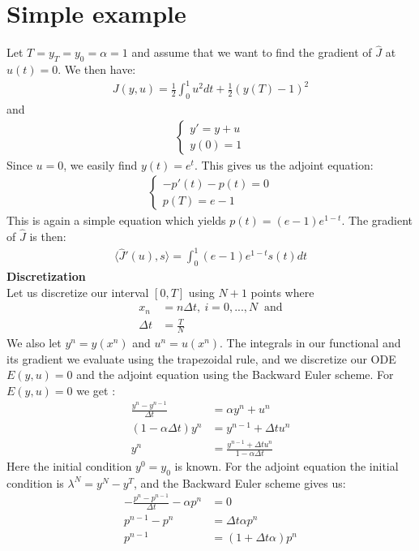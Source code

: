 \documentclass[11pt,a4paper]{article}
\begin{document}
\section*{Simple example}
Let $T=y_T=y_0=\alpha=1$ and assume that we want to find the gradient of $\hat{J}$ at $u(t)=0$. We then have:
\begin{gather}
J(y,u) = \frac{1}{2}\int_0^1u^2dt + \frac{1}{2}(y(T)-1)^2
\end{gather} 
and
\begin{align}
\left\{
     \begin{array}{lr}
       	y' =  y +u\\
       	   y(0)=1
     \end{array}
   \right.
\end{align}
Since $u=0$, we easily find $y(t)=e^t$. This gives us the adjoint equation:
\begin{align}
   \left\{
     \begin{array}{lr}
       -p'(t) -p(t)=0  \\
       p(T) = e-1
     \end{array}
   \right.
\end{align}
This is again a simple equation which yields $p(t)=(e-1)e^{1-t}$. The gradient of $\hat{J}$ is then:
\begin{align*}
\langle\hat{J}'(u),s\rangle=\int_0^1(e-1)e^{1-t}s(t)dt
\end{align*}
\textbf{Discretization}
\\
Let us discretize our interval $[0,T]$ using $N+1$ points where 
\begin{align*}
x_n &= n\Delta t, \ i=0,...,N \ \text{ and} \\
\Delta t &= \frac{T}{N}
\end{align*}
We also let $y^n = y(x^n)$ and $u^n=u(x^n)$. The integrals in our functional and its gradient we evaluate using the trapezoidal rule, and we discretize our ODE $E(y,u)=0$ and the adjoint equation using the Backward Euler scheme. For $E(y,u)=0$ we get :
\begin{align*}
\frac{y^n-y^{n-1}}{\Delta t} &= \alpha y^{n} + u^{n} \\
(1-\alpha\Delta t)y^{n} &= y^{n-1} +\Delta t u^{n} \\
y^n &=\frac{y^{n-1} +\Delta t u^{n}}{1-\alpha\Delta t}
\end{align*} 
Here the initial condition $y^0=y_0$ is known. For the adjoint equation the initial condition is $\lambda^N = y^N-y^T $, and the Backward Euler scheme gives us:
\begin{align*}
-\frac{p^n-p^{n-1}}{\Delta t} -\alpha p^n &=0 \\
p^{n-1} -p^n &=\Delta t\alpha p^n \\
p^{n-1} &= (1+\Delta t\alpha)p^n
\end{align*}
\end{document}
